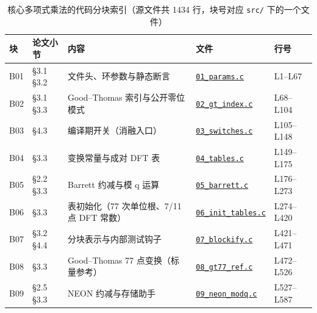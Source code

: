\begin{table}[htbp]
\centering
\caption{核心多项式乘法的代码分块索引（源文件共 1434 行，块号对应 \texttt{src/} 下的一个文件）}
\label{tab:code-map}
\footnotesize
\begin{tabular}{@{}llp{4.25cm}p{2.95cm}l@{}}
\toprule
块 & 论文小节 & 内容 & 文件 & 行号 \\
\midrule
B01 & \S3.1 \S3.2 & \raggedright 文件头、环参数与静态断言 & \raggedright \href{https://github.com/karry190805/sntrup653-crt-neon/blob/b17bbf3/src/01_params.c}{\texttt{01\_\allowbreak{}params.c}} & L1--L67 \\
B02 & \S3.1 \S3.3 & \raggedright Good–Thomas 索引与公开零位模式 & \raggedright \href{https://github.com/karry190805/sntrup653-crt-neon/blob/b17bbf3/src/02_gt_index.c}{\texttt{02\_\allowbreak{}gt\_\allowbreak{}index.c}} & L68--L104 \\
B03 & \S4.3 & \raggedright 编译期开关（消融入口） & \raggedright \href{https://github.com/karry190805/sntrup653-crt-neon/blob/b17bbf3/src/03_switches.c}{\texttt{03\_\allowbreak{}switches.c}} & L105--L148 \\
B04 & \S3.3 & \raggedright 变换常量与成对 DFT 表 & \raggedright \href{https://github.com/karry190805/sntrup653-crt-neon/blob/b17bbf3/src/04_tables.c}{\texttt{04\_\allowbreak{}tables.c}} & L149--L175 \\
B05 & \S2.2 \S3.3 & \raggedright Barrett 约减与模 q 运算 & \raggedright \href{https://github.com/karry190805/sntrup653-crt-neon/blob/b17bbf3/src/05_barrett.c}{\texttt{05\_\allowbreak{}barrett.c}} & L176--L273 \\
B06 & \S3.3 & \raggedright 表初始化（77 次单位根、7/11 点 DFT 常数） & \raggedright \href{https://github.com/karry190805/sntrup653-crt-neon/blob/b17bbf3/src/06_init_tables.c}{\texttt{06\_\allowbreak{}init\_\allowbreak{}tables.c}} & L274--L420 \\
B07 & \S3.2 \S4.4 & \raggedright 分块表示与内部测试钩子 & \raggedright \href{https://github.com/karry190805/sntrup653-crt-neon/blob/b17bbf3/src/07_blockify.c}{\texttt{07\_\allowbreak{}blockify.c}} & L421--L471 \\
B08 & \S3.3 & \raggedright Good–Thomas 77 点变换（标量参考） & \raggedright \href{https://github.com/karry190805/sntrup653-crt-neon/blob/b17bbf3/src/08_gt77_ref.c}{\texttt{08\_\allowbreak{}gt77\_\allowbreak{}ref.c}} & L472--L526 \\
B09 & \S2.5 \S3.3 & \raggedright NEON 约减与存储助手 & \raggedright \href{https://github.com/karry190805/sntrup653-crt-neon/blob/b17bbf3/src/09_neon_modq.c}{\texttt{09\_\allowbreak{}neon\_\allowbreak{}modq.c}} & L527--L587 \\

\end{tabular}
\end{table}
